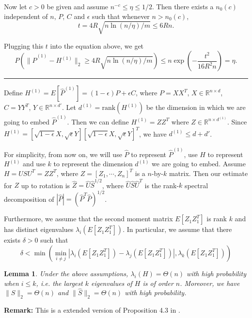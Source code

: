 \documentclass[a4paper]{article}
\newenvironment{proof}{{\bf Proof:  }}{\hfill\rule{2mm}{2mm}}
\newtheorem{lemma}[fact]{Lemma}
\begin{document}
\begin{proof}
Now let $c > 0$ be given and assume $n^{-c} \le \eta \le 1/2$. Then there exists a $n_0(c)$ independent of $n$, $P$, $C$ and $\epsilon$ such that whenever $n > n_0(c)$,
\[
	t =  4 R \sqrt{n \ln(n/\eta)/m} \le 6 R n.
\]

Plugging this $t$ into the equation above, we get
\[
	P(\| \hat{P}^{(1)} - H^{(1)} \|_2 \ge 4 R \sqrt{n \ln(n/\eta)/m})
    \le n \exp\left(-\frac{t^2}{16 R^2 n}\right) = \eta.
\]
\end{proof}

Define $H^{(1)} = E[\hat{P}^{(1)}] = (1-\epsilon) P + \epsilon C$, where $P = X X^T$, $X \in \mathbb{R}^{n \times d}$, $C = Y Y^T$, $Y \in \mathbb{R}^{n\times d'}$.
Let $d^{(1)} = \mathrm{rank}(H^{(1)})$ be the dimension in which we are going to embed $\hat{P}^{(1)}$. Then we can define $H^{(1)} = Z Z^T$ where $Z \in \mathbb{R}^{n \times d^{(1)}}$.
Since $H^{(1)} = [\sqrt{1-\epsilon} X, \sqrt{\epsilon} Y] [\sqrt{1-\epsilon} X, \sqrt{\epsilon} Y]^T$, we have $d^{(1)} \le d+d'$.


For simplicity, from now on, we will use $\hat{P}$ to represent $\hat{P}^{(1)}$, use $H$ to represent $H^{(1)}$ and use $k$ to represent the dimension $d^{(1)}$ we are going to embed. Assume $H = U S U^T = Z Z^T$, where $Z = [Z_1, \cdots, Z_n]^T$ is a $n$-by-$k$ matrix. Then our estimate for $Z$ up to rotation is $\hat{Z} = \hat{U} \hat{S}^{1/2}$, where $\hat{U} \hat{S} \hat{U}^T$ is the rank-$k$ spectral decomposition of $|\hat{P}| = (\hat{P}^T \hat{P})^{1/2}$.

Furthermore, we assume that the second moment matrix $E[Z_1 Z_1^T]$ is rank $k$ and has distinct eigenvalues $\lambda_i(E[Z_1 Z_1^T])$. In particular, we assume that there exists $\delta > 0$ such that
\[
	\delta < \min \left( \min_{i \ne j} |\lambda_i(E[Z_1 Z_1^T]) - \lambda_j(E[Z_1 Z_1^T])|, \lambda_k(E[Z_1 Z_1^T]) \right)
\]

\begin{lemma}
\label{lemma:eigSShatL1}
Under the above assumptions, $\lambda_i(H) = \Theta(n)$ with high probability when $i \le k$, i.e. the largest $k$ eigenvalues of $H$ is of order $n$. Moreover, we have $\| S \|_2 = \Theta(n)$ and $\| \hat{S} \|_2 = \Theta(n)$ with high probability.
\end{lemma}
\textbf{Remark:} This is a extended version of Proposition 4.3 in \cite{sussman2014consistent}.
\end{document}
